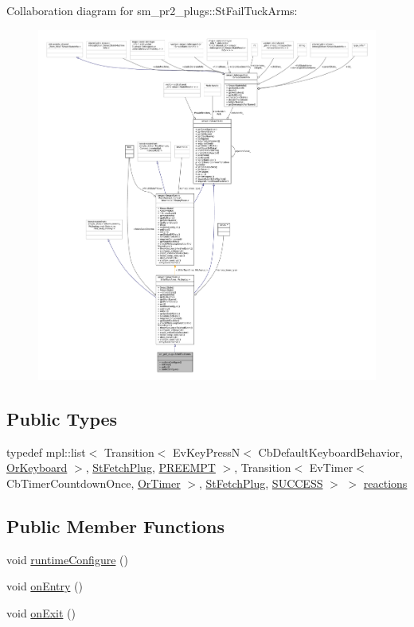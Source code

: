 Collaboration diagram for sm\+\_\+pr2\+\_\+plugs\+:\+:St\+Fail\+Tuck\+Arms\+:
\nopagebreak
\begin{figure}[H]
\begin{center}
\leavevmode
\includegraphics[width=350pt]{structsm__pr2__plugs_1_1StFailTuckArms__coll__graph}
\end{center}
\end{figure}
\subsection*{Public Types}
\begin{DoxyCompactItemize}
\item 
typedef mpl\+::list$<$ Transition$<$ Ev\+Key\+PressN$<$ Cb\+Default\+Keyboard\+Behavior, \hyperlink{classsm__pr2__plugs_1_1OrKeyboard}{Or\+Keyboard} $>$, \hyperlink{structsm__pr2__plugs_1_1StFetchPlug}{St\+Fetch\+Plug}, \hyperlink{classPREEMPT}{P\+R\+E\+E\+M\+PT} $>$, Transition$<$ Ev\+Timer$<$ Cb\+Timer\+Countdown\+Once, \hyperlink{classsm__pr2__plugs_1_1OrTimer}{Or\+Timer} $>$, \hyperlink{structsm__pr2__plugs_1_1StFetchPlug}{St\+Fetch\+Plug}, \hyperlink{classSUCCESS}{S\+U\+C\+C\+E\+SS} $>$ $>$ \hyperlink{structsm__pr2__plugs_1_1StFailTuckArms_a722dbc85911ba3976f94bbc08eb06eac}{reactions}
\end{DoxyCompactItemize}
\subsection*{Public Member Functions}
\begin{DoxyCompactItemize}
\item 
void \hyperlink{structsm__pr2__plugs_1_1StFailTuckArms_aa120c686b41ea5ab0e55d4545757cc1d}{runtime\+Configure} ()
\item 
void \hyperlink{structsm__pr2__plugs_1_1StFailTuckArms_a8162cf289e316df08bf51f301309456b}{on\+Entry} ()
\item 
void \hyperlink{structsm__pr2__plugs_1_1StFailTuckArms_a50dcc96c16ca2ccfe31daf5771781f3d}{on\+Exit} ()
\end{DoxyCompactItemize}
